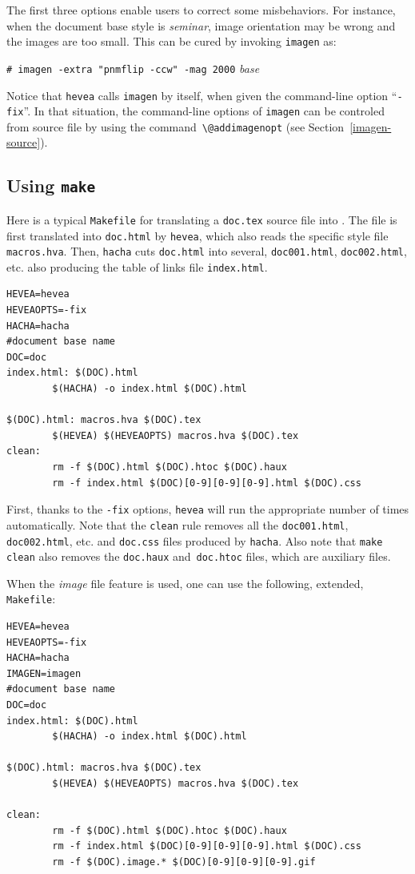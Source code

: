 The first three options enable users to correct some misbehaviors.
For instance, when the document base style is \textit{seminar}, image
orientation may
be wrong and the images are too small. This can be cured by invoking
\texttt{imagen} as:
\begin{flushleft}
\texttt{\# imagen  -extra "pnmflip -ccw" -mag 2000} \textit{base}
\end{flushleft}

Notice that \texttt{hevea} calls \texttt{imagen} by itself,
when given the command-line option ``\texttt{-fix}''.
In that situation, the command-line options of \texttt{imagen} can
be controled from source file by using the
command~\verb+\@addimagenopt+ (see Section~\ref{imagen-source}).

\subsection{Using \texttt{make}}\label{makefile}

Here is a typical \texttt{Makefile} for translating a \texttt{doc.tex}
source file into \html.
The file is first translated into \texttt{doc.html} by \texttt{hevea},
which also reads
the specific style file \texttt{macros.hva}.
Then, \texttt{hacha} cuts \texttt{doc.html} into several,
\texttt{doc001.html}, \texttt{doc002.html}, etc. also producing the
table of links file \texttt{index.html}.
\begin{verbatim}
HEVEA=hevea
HEVEAOPTS=-fix
HACHA=hacha
#document base name
DOC=doc
index.html: $(DOC).html
        $(HACHA) -o index.html $(DOC).html

$(DOC).html: macros.hva $(DOC).tex
        $(HEVEA) $(HEVEAOPTS) macros.hva $(DOC).tex
clean:
        rm -f $(DOC).html $(DOC).htoc $(DOC).haux
        rm -f index.html $(DOC)[0-9][0-9][0-9].html $(DOC).css
\end{verbatim}
First, thanks to the \verb+-fix+ options, \texttt{hevea} will run the
appropriate number of times automatically.
Note that the \texttt{clean} rule removes all the \texttt{doc001.html},
\texttt{doc002.html}, etc. and \texttt{doc.css} files produced by
\texttt{hacha}.
Also note that \texttt{make clean} also removes the
\texttt{doc.haux} and~\texttt{doc.htoc} files, which are \hevea{}
auxiliary files.


When the \textit{image} file feature is used, one can use the
following, extended, \texttt{Makefile}:
\begin{verbatim}
HEVEA=hevea
HEVEAOPTS=-fix
HACHA=hacha
IMAGEN=imagen
#document base name
DOC=doc
index.html: $(DOC).html
        $(HACHA) -o index.html $(DOC).html

$(DOC).html: macros.hva $(DOC).tex
        $(HEVEA) $(HEVEAOPTS) macros.hva $(DOC).tex

clean:
        rm -f $(DOC).html $(DOC).htoc $(DOC).haux
        rm -f index.html $(DOC)[0-9][0-9][0-9].html $(DOC).css
        rm -f $(DOC).image.* $(DOC)[0-9][0-9][0-9].gif
\end{verbatim}

